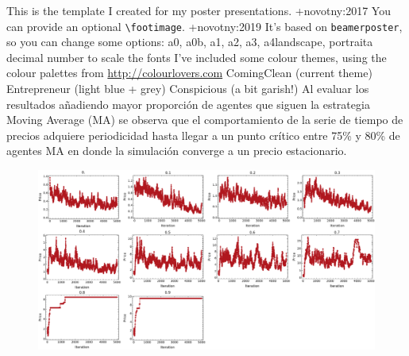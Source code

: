 \markdownRendererInterblockSeparator
{}\markdownRendererUlBegin
\markdownRendererUlItem This is the template I created for my poster presentations. +{}{}{novotny:2017}\markdownRendererUlItemEnd 
\markdownRendererUlItem You can provide an optional \texttt{\textbackslash footimage}. +{}{}{novotny:2019}\markdownRendererUlItemEnd 
\markdownRendererUlEnd \markdownRendererInterblockSeparator
{}\markdownRendererHorizontalRule{}\markdownRendererInterblockSeparator
{}\markdownRendererInterblockSeparator
{}\markdownRendererUlBegin
\markdownRendererUlItem It's based on \texttt{beamerposter}, so you can change some options:\markdownRendererInterblockSeparator
{}\markdownRendererDlBegin
{}\markdownRendererDlDefinitionBegin a0, a0b, a1, a2, a3, a4\markdownRendererDlDefinitionEnd \markdownRendererDlItemEnd {}\markdownRendererDlDefinitionBegin landscape, portrait\markdownRendererDlDefinitionEnd \markdownRendererDlItemEnd {}\markdownRendererDlDefinitionBegin a decimal number to scale the fonts\markdownRendererDlDefinitionEnd \markdownRendererDlItemEnd 
\markdownRendererDlEnd\markdownRendererUlItemEnd 
\markdownRendererUlEnd \markdownRendererInterblockSeparator
{}\markdownRendererHorizontalRule{}\markdownRendererInterblockSeparator
{}\markdownRendererInterblockSeparator
{}\markdownRendererUlBegin
\markdownRendererUlItem I've included some colour themes, using the colour palettes from \url{http://colourlovers.com}\markdownRendererInterblockSeparator
{}\markdownRendererUlBegin
\markdownRendererUlItem ComingClean (current theme)\markdownRendererUlItemEnd 
\markdownRendererUlItem Entrepreneur (light blue + grey)\markdownRendererUlItemEnd 
\markdownRendererUlItem Conspicious (a bit garish!)\markdownRendererUlItemEnd 
\markdownRendererUlEnd \markdownRendererUlItemEnd 
\markdownRendererUlEnd \markdownRendererInterblockSeparator
{}\markdownRendererHorizontalRule{}\markdownRendererInterblockSeparator
{}\markdownRendererInterblockSeparator
{}Al evaluar los resultados añadiendo mayor proporción de agentes que siguen la estrategia Moving Average (MA) se observa que el comportamiento de la serie de tiempo de precios adquiere periodicidad hasta llegar a un punto crítico entre 75\% y 80\% de agentes MA en donde la simulación converge a un precio estacionario.\markdownRendererInterblockSeparator
{}\begin{figure}[h!] \centering \includegraphics[scale=0.2]{img/price_series.png} \end{figure}\markdownRendererInterblockSeparator
{}\markdownRendererHorizontalRule{}\relax